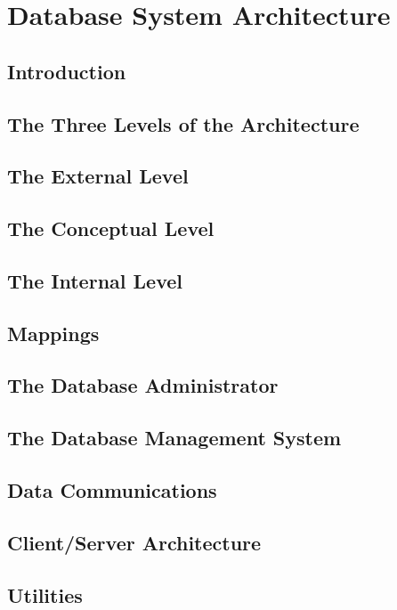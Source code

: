\documentclass{book}
\begin{document}
\chapter{Database System Architecture}

\section{Introduction}

\section{The Three Levels of the Architecture}

\section{The External Level}

\section{The Conceptual Level}

\section{The Internal Level}

\section{Mappings}

\section{The Database Administrator}

\section{The Database Management System}

\section{Data Communications}

\section{Client/Server Architecture}

\section{Utilities}
\end{document}
